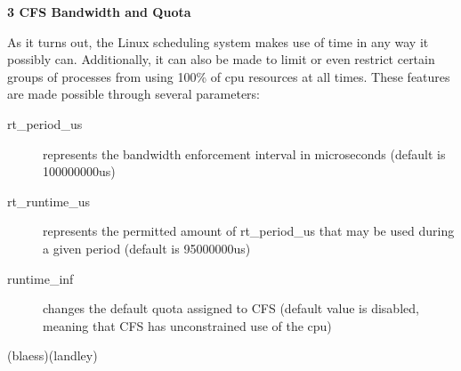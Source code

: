\vspace{1pc}

\noindent\textbf{3 CFS Bandwidth and Quota}

\vspace{1pc}

As it turns out, the Linux scheduling system makes use of time in any way it possibly can. Additionally, it can also be made to limit or even restrict certain groups of processes from using 100\% of cpu resources at all times. These features are made possible through several parameters:
\begin{description}
	\item [rt\_period\_us] represents the bandwidth enforcement interval in microseconds (default is 100000000us)
	\item [rt\_runtime\_us] represents the permitted amount of rt\_period\_us that may be used during a given period (default is 95000000us)
	\item [runtime\_inf] changes the default quota assigned to CFS (default value is disabled, meaning that CFS has unconstrained use of the cpu)
\end{description}

(blaess)(landley)